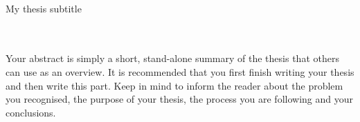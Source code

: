 \begin{center}
    \LARGE
     \\
     \vspace{0.5cm}
    My thesis subtitle \\
    \vspace{0.4cm}
     \\
    \vspace{1.5cm}
\\
\vspace{25mm}
\end{center}
\begin{center}
Your abstract is simply a short, stand-alone summary of the thesis that others can use as an overview. It is recommended that you first finish writing your thesis and then write this part. Keep in mind to inform the reader about the problem you recognised, the purpose of your thesis, the process you are following and your conclusions.
\end{center}
\vfill